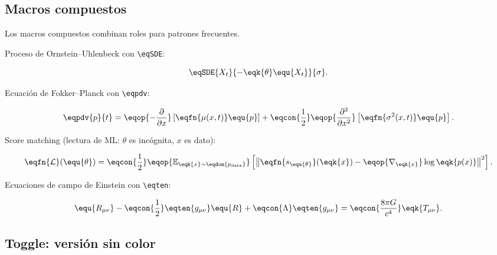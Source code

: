 \subsection{Macros compuestos}

Los macros compuestos combinan roles para patrones frecuentes.

Proceso de Ornstein--Uhlenbeck con \texttt{\textbackslash eqSDE}:

\begin{equation}
\label{eq:ou}
\eqSDE{X_t}{-\eqk{\theta} \equ{X_t}}{\sigma}.
\end{equation}

Ecuación de Fokker--Planck con \texttt{\textbackslash eqpdv}:

\begin{equation}
\label{eq:fokker-planck}
\eqpdv{p}{t}
=
\eqop{-\frac{\partial}{\partial x}}
\left[ \eqfn{\mu(x,t)} \equ{p} \right]
+
\eqcon{\frac{1}{2}}
\eqop{\frac{\partial^2}{\partial x^2}}
\left[ \eqfn{\sigma^2(x,t)} \equ{p} \right].
\end{equation}

Score matching (lectura de ML: $\theta$ es incógnita, $x$ es dato):

\begin{equation}
\label{eq:score-matching}
\eqfn{\mathcal{L}}(\equ{\theta})
=
\eqcon{\frac{1}{2}}
\eqop{\mathbb{E}_{\eqk{x} \sim \eqdom{p_{\text{data}}}}}
\left[
  \norm{
    \eqfn{s_{\equ{\theta}}}(\eqk{x})
    - \eqop{\nabla_{\eqk{x}}} \log \eqk{p(x)}
  }^2
\right].
\end{equation}

Ecuaciones de campo de Einstein con \texttt{\textbackslash eqten}:

\begin{equation}
\label{eq:einstein}
\equ{R_{\mu\nu}} - \eqcon{\frac{1}{2}} \eqten{g_{\mu\nu}} \equ{R}
+ \eqcon{\Lambda} \eqten{g_{\mu\nu}}
= \eqcon{\frac{8\pi G}{c^4}} \eqk{T_{\mu\nu}}.
\end{equation}

\subsection{Toggle: versión sin color}

